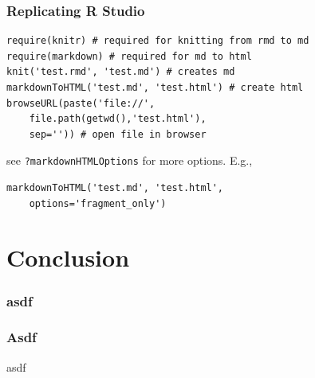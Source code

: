 \begin{frame}[fragile]\frametitle{Replicating R Studio}

\begin{verbatim}
require(knitr) # required for knitting from rmd to md
require(markdown) # required for md to html 
knit('test.rmd', 'test.md') # creates md 
markdownToHTML('test.md', 'test.html') # create html
browseURL(paste('file://', 
    file.path(getwd(),'test.html'), 
    sep='')) # open file in browser
\end{verbatim}

see \texttt{?markdownHTMLOptions} for more options. E.g.,

\begin{verbatim}
markdownToHTML('test.md', 'test.html', 
    options='fragment_only')
\end{verbatim}

\end{frame}

\section{Conclusion}

\begin{frame}\frametitle{asdf}

\end{frame}

\begin{frame}\frametitle{Asdf}

asdf

\end{frame}

